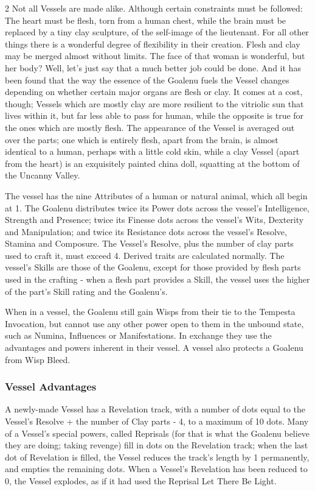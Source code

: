 \begin{multicols}{2}
Not all Vessels are made alike. Although certain constraints must be followed: The heart must be flesh, torn from a human chest, while the brain must be replaced by a tiny clay sculpture, of the self-image of the lieutenant. For all other things there is a wonderful degree of flexibility in their creation. Flesh and clay may be merged almost without limits. The face of that woman is wonderful, but her body? Well, let’s just say that a much better job could be done. And it has been found that the way the essence of the Goalenu fuels the Vessel changes depending on whether certain major organs are flesh or clay. It comes at a cost, though; Vessels which are mostly clay are more resilient to the vitriolic sun that lives within it, but far less able to pass for human, while the opposite is true for the ones which are mostly flesh. The appearance of the Vessel is averaged out over the parts; one which is entirely flesh, apart from the brain, is almost identical to a human, perhaps with a little cold skin, while 
a clay Vessel (apart from the heart) is an exquisitely painted china doll, squatting at the bottom of the Uncanny Valley.

The vessel has the nine Attributes of a human or natural animal, which all begin at 1. The Goalenu distributes twice its Power dots across the vessel's Intelligence, Strength and Presence; twice its Finesse dots across the vessel's Wits, Dexterity and Manipulation; and twice its Resistance dots across the vessel's Resolve, Stamina and Composure. The Vessel's Resolve, plus the number of clay parts used to craft it, must exceed 4. Derived traits are calculated normally. The vessel's Skills are those of the Goalenu, except for those provided by flesh parts used in the crafting - when a flesh part provides a Skill, the vessel uses the higher of the part's Skill rating and the Goalenu's.

When in a vessel, the Goalenu still gain Wisps from their tie to the Tempesta Invocation, but cannot use any other power open to them in the unbound state, such as Numina, Influences or Manifestations. In exchange they use the advantages and powers inherent in their vessel. A vessel also protects a Goalenu from Wisp Bleed. 

\subsubsection*{Vessel Advantages}

A newly-made Vessel has a Revelation track, with a number of dots equal to the Vessel's Resolve + the number of Clay parts - 4, to a maximum of 10 dots. Many of a Vessel's special powers, called Reprisals (for that is what the Goalenu believe they are doing; taking revenge) fill in dots on the Revelation track; when the last dot of Revelation is filled, the Vessel reduces the track's length by 1 permanently, and empties the remaining dots.  When a Vessel's Revelation has been reduced to 0, the Vessel explodes, as if it had used the Reprisal Let There Be Light.


\end{multicols}
